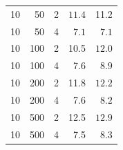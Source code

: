 \begin{table}[t]
\begin{minipage}{0.50\textwidth}
{\begin{tabular}{rrr|rr}
				10 & 50  & 2 & $\mathbf{11.4}$ & 11.2 \\
				10 & 50  & 4 & $\mathbf{7.1}$ & $\mathbf{7.1}$ \\
				10 & 100 & 2 & 10.5 & $\mathbf{12.0}$ \\
				10 & 100 & 4 & 7.6 & $\mathbf{8.9}$ \\
				10 & 200 & 2 & 11.8 & $\mathbf{12.2}$ \\
				10 & 200 & 4 & 7.6 & $\mathbf{8.2}$ \\
				10 & 500 & 2 & 12.5 & $\mathbf{12.9}$ \\
				10 & 500 & 4 & 7.5 & $\mathbf{8.3}$ \\
				\hline
		\end{tabular}}
	\end{minipage}
	
\end{table}